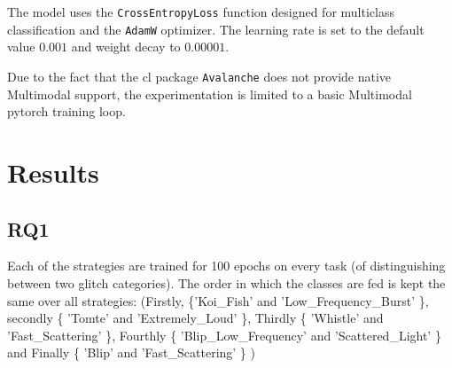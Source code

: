 The model uses the \verb|CrossEntropyLoss| function designed for multiclass classification and the \verb|AdamW| optimizer. The learning rate is set to the default value $0.001$ and weight decay to $0.00001$.

Due to the fact that the \acrshort{cl} package \verb|Avalanche| \citep{lomonaco2021avalanche} does not provide native Multimodal support, the experimentation is limited to a basic Multimodal pytorch training loop. 
\newpage
\section{Results}
\subsection{RQ1}
\label{subsec:RQ1}
Each of the strategies are trained for 100 epochs on every task (of distinguishing between two glitch categories). The order in which the classes are fed is kept the same over all strategies:  
(Firstly, \{'Koi\_Fish' and 'Low\_Frequency\_Burst' \}, secondly \{ 'Tomte' and 'Extremely\_Loud' \}, Thirdly \{ 'Whistle' and 'Fast\_Scattering' \}, Fourthly \{ 'Blip\_Low\_Frequency' and 'Scattered\_Light' \} and Finally \{ 'Blip' and 'Fast\_Scattering' \} )

